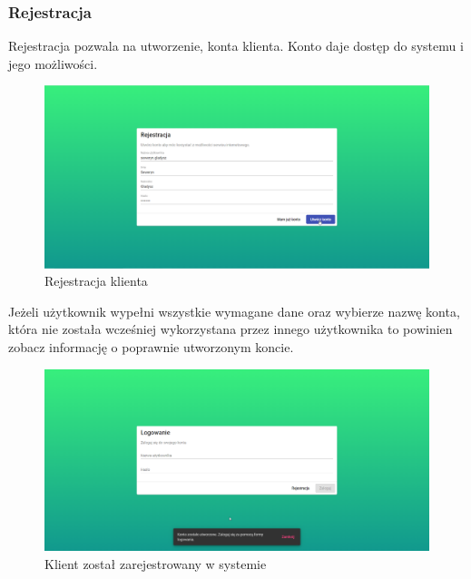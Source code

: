 \documentclass[a4paper,twoside,12pt]{book}
\begin{document}
\subsubsection{Rejestracja}
Rejestracja pozwala na utworzenie, konta klienta. Konto daje dostęp do systemu i jego możliwości.
\begin{figure}[H]
	\centering
	\includegraphics[width=1\linewidth]{../zrzuty_ekranu/dzialanie/rejestracja_logowanie/rejestracja}
	\caption{Rejestracja klienta}
	\label{fig:rejestracja}
\end{figure}
Jeżeli użytkownik wypełni wszystkie wymagane dane oraz wybierze nazwę konta, która nie została wcześniej wykorzystana przez innego użytkownika to powinien zobacz informację o poprawnie utworzonym koncie.
\begin{figure}[H]
	\centering
	\includegraphics[width=1\linewidth]{../zrzuty_ekranu/dzialanie/rejestracja_logowanie/konto_utworzone}
	\caption{Klient został zarejestrowany w systemie}
	\label{fig:kontoutworzone}
\end{figure}
\end{document}
